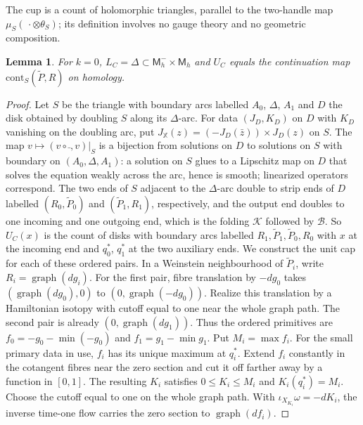 \documentclass[11pt]{amsart}
\newtheorem{lemma}[theorem]{Lemma}
\theoremstyle{definition}
\theoremstyle{remark}
\theoremstyle{plain}
\numberwithin{equation}{section}
\newcommand{\Msf}{\mathsf{M}}
\begin{document}
The cup is a count of holomorphic triangles, parallel to the two-handle map
$\mu_S(\,\cdot\otimes\theta_S)$; its definition involves no gauge theory and no
geometric composition.

\begin{lemma}\label{lem:diagonal-cup}
For $k=0$, $L_C=\Delta\subset\Msf_h^-\times\Msf_h$ and $U_C$ equals the continuation
map $\mathrm{cont}_S(\widetilde P,R)$ on homology.
\end{lemma}

\begin{proof}
Let $S$ be the triangle with boundary arcs labelled $A_0$, $\Delta$, $A_1$ and
$D$ the disk obtained by doubling $S$ along its $\Delta$-arc. For data
$(J_D,K_D)$ on $D$ with $K_D$ vanishing on the doubling arc, put
$J_{\mathbb X}(z)=(-J_D(\bar z))\times J_D(z)$ on $S$. The map $v\mapsto(v\circ\bar{\ },v)|_S$ is a
bijection from solutions on $D$ to solutions on $S$ with boundary on
$(A_0,\Delta,A_1)$: a solution on $S$ glues to a Lipschitz map on $D$ that solves
the equation weakly across the arc, hence is smooth; linearized operators
correspond. The two ends of $S$ adjacent to the $\Delta$-arc double to strip
ends of $D$ labelled $(R_0,\widetilde P_0)$ and
$(\widetilde P_1,R_1)$, respectively, and the output end doubles to one
incoming and one outgoing end, which is the folding $\mathcal K$ followed by
$\mathcal B$. So $U_C(x)$ is the count of disks with boundary arcs labelled
$R_1,\widetilde P_1,\widetilde P_0,R_0$ with $x$ at the incoming end and $q_0^*$,
$q_1^*$ at the two auxiliary ends. We construct the unit cap for
each of these ordered pairs. In a Weinstein neighbourhood of
$\widetilde P_i$, write $R_i=\operatorname{graph}(dg_i)$.
For the first pair, fibre translation by $-dg_0$ takes
$(\operatorname{graph}(dg_0),0)$ to
$(0,\operatorname{graph}(-dg_0))$. Realize this translation by a
Hamiltonian isotopy with cutoff equal to one near the whole graph
path. The second pair is already $(0,\operatorname{graph}(dg_1))$.
Thus the ordered primitives are
$f_0=-g_0-\min(-g_0)$ and $f_1=g_1-\min g_1$.
Put $M_i=\max f_i$. For the small primary data in use, $f_i$
has its unique maximum at $q_i^*$. Extend $f_i$ constantly in the
cotangent fibres near the zero section and cut it off farther away
by a function in $[0,1]$. The resulting $K_i$ satisfies
$0\le K_i\le M_i$ and $K_i(q_i^*)=M_i$. Choose the cutoff
equal to one on the whole graph path. With
$\iota_{X_{K_i}}\omega=-dK_i$, the inverse time-one flow
carries the zero section to $\operatorname{graph}(df_i)$.


\end{proof}
\end{document}
